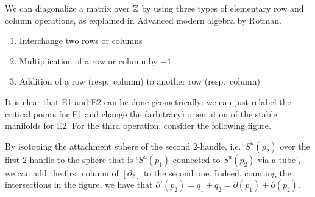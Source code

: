 We can diagonalize a matrix over $\mathbb{Z}$ by using three types of elementary row and column operations, as explained in Advanced modern algebra by Rotman.
\begin{samepage}
\begin{enumerate}[E1]
    \item Interchange two rows or columns
    \item Multiplication of a row or column by $-1$
    \item Addition of a row (resp.~column) to another row (resp.~column)
\end{enumerate}
\end{samepage}
It is clear that E1 and E2 can be done geometrically: we can just relabel the critical points for E1 and change the (arbitrary) orientation of the stable manifolds for E2.
For the third operation, consider the following figure.
\begin{figure}[H]
    \centering
\end{figure}
By isotoping the attachment sphere of the second $2$-handle, i.e.\ $S^{u}(p_2)$ over the first $2$-handle to the sphere that is `$S^{u}(p_1)$ connected to $S^{u}(p_2)$ via a tube', we can add the first column of $[\partial_2]$ to the second one. Indeed, counting the intersections in the figure, we have that $\partial'(p_2) = q_1 + q_2 = \partial(p_1) + \partial(p_2)$.


